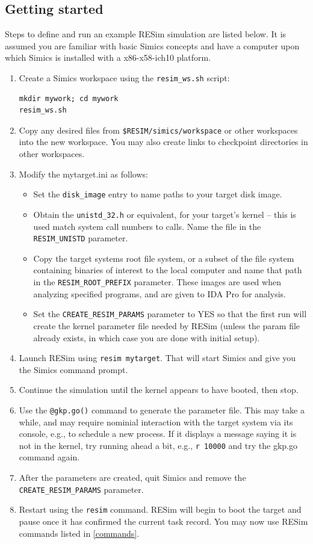 \documentclass[titlepage]{article}
\begin{document}
\subsection{Getting started}
\label{getting-started}
Steps to define and run an example RESim simulation are listed below.  It is assumed you are familiar with basic Simics concepts and have a
computer upon which Simics is installed with a x86-x58-ich10 platform.
\begin{enumerate}
\item Create a Simics workspace using the {\tt resim\_ws.sh} script:
\begin{verbatim}
mkdir mywork; cd mywork
resim_ws.sh
\end{verbatim}

\item Copy any desired files from {\tt \$RESIM/simics/workspace} or other workspaces into the new workspace.  You may also create links
to checkpoint directories in other workspaces.
\item Modify the mytarget.ini as follows:
\begin{itemize}
\item Set the {\tt disk\_image} entry to name paths to your target disk image.
\item Obtain the {\tt unistd\_32.h} or equivalent, for your target's kernel -- this is used match system call numbers to calls.  Name
the file in the {\tt RESIM\_UNISTD} parameter.
\item Copy the target systems root file system, or a subset of the file system containing binaries of interest to the local computer
and name that path in the {\tt RESIM\_ROOT\_PREFIX} parameter.  These images are used when analyzing specified programs, and are given
to IDA Pro for analysis.
\item Set the {\tt CREATE\_RESIM\_PARAMS} parameter to YES so that the first run will create the kernel parameter file needed by RESim
(unless the param file already exists, in which case you are done with initial setup).
\end{itemize}
\item Launch RESim using {\tt resim mytarget}.  That will start Simics and give you the Simics command prompt.
\item  Continue the simulation until the kernel appears to have booted, then stop.
\item Use the {\tt @gkp.go()} command to generate the parameter file.  This may take a while, and may require nominial interaction
with the target system via its console, e.g., to schedule a new process.  If it displays a message saying it is not in the kernel,
try running ahead a bit, e.g., {\tt r 10000} and try the gkp.go command again.
\item After the parameters are created, quit Simics and remove the {\tt CREATE\_RESIM\_PARAMS} parameter.
\item Restart using the {\tt resim} command.  RESim will begin to boot the target and pause once it has confirmed the current task record.  You
may now use RESim commands listed in \ref{commands}.
\end{enumerate}
\end{document}
